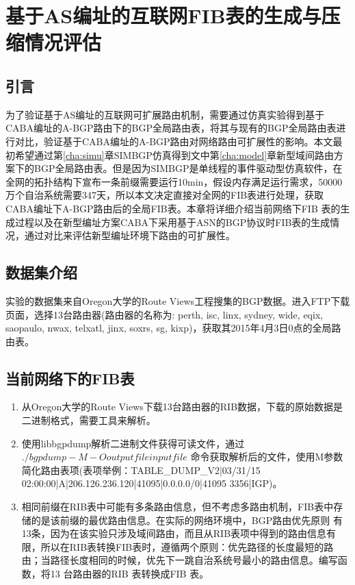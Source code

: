 

\chapter{基于AS编址的互联网FIB表的生成与压缩情况评估}
\label{cha:compression}
\section{引言}
为了验证基于AS编址的互联网可扩展路由机制，需要通过仿真实验得到基于CABA编址的A-BGP路由下的BGP全局路由表，将其与现有的BGP全局路由表进行对比，验证基于CABA编址的A-BGP路由对网络路由可扩展性的影响。本文最初希望通过第\ref{cha:simu}章SIMBGP仿真得到文中第\ref{cha:model}章新型域间路由方案下的BGP全局路由表。但是因为SIMBGP是单线程的事件驱动型仿真软件，在全网的拓扑结构下宣布一条前缀需要运行10min，假设内存满足运行需求，50000万个自治系统需要347天，所以本文决定直接对全网的FIB表进行处理，获取CABA编址下A-BGP路由后的全局FIB表。本章将详细介绍当前网络下FIB 表的生成过程以及在新型编址方案CABA下采用基于ASN的BGP协议时FIB表的生成情况，通过对比来评估新型编址环境下路由的可扩展性。
\section{数据集介绍}
实验的数据集来自Oregon大学的Route Views工程搜集的BGP数据。进入FTP下载页面，选择13台路由器(路由器的名称为: perth, isc, linx, sydney, wide, eqix, saopaulo, nwax, telxatl, jinx, soxrs, sg, kixp)，获取其2015年4月3日0点的全局路由表。

\section{当前网络下的FIB表}
\label{sect:fibtab}
\begin{enumerate}
\item 从Oregon大学的Route Views下载13台路由器的RIB数据，下载的原始数据是二进制格式，需要工具来解析。
\item 使用libbgpdump解析二进制文件获得可读文件，通过$./bgpdump -M -O outputfile inputfile$ 命令获取解析后的文件，使用M参数简化路由表项(表项举例：TABLE\_DUMP\_V2|03/31/15 02:00:00|A|206.126.236.120|41095|0.0.0.0/0|41095 3356|IGP)。
\item 相同前缀在RIB表中可能有多条路由信息，但不考虑多路由机制，FIB表中存储的是该前缀的最优路由信息。在实际的网络环境中，BGP路由优先原则
    \cite{preferRoutingPrinciple}有13条，因为在该实验只涉及域间路由，而且从RIB表项中得到的路由信息有限，所以在RIB表转换FIB表时，遵循两个原则：优先路径的长度最短的路由；当路径长度相同的时候，优先下一跳自治系统号最小的路由信息。编写函数，将13 台路由器的RIB 表转换成FIB 表。
\end{enumerate}

